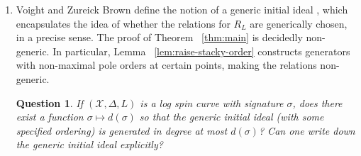 \documentclass{amsart}
\theoremstyle{plain}
\newtheorem{question}[thm]{Question}
\theoremstyle{definition}
\theoremstyle{remark}
\numberwithin{equation}{section}
\newcommand\sx{\mathscr X}
\newcommand{\halfcan}{L}
\begin{document}
\begin{enumerate}
	\item Voight and Zureick Brown define
		the notion of a generic initial ideal \cite[Definition 2.2.7]{vzb:stacky}, which 
		encapsulates the idea of whether the relations for $R_\halfcan$ are 
		generically chosen, in a precise sense. 
		The proof of Theorem
		~\ref{thm:main} is decidedly non-generic. 
		In particular, Lemma ~\ref{lem:raise-stacky-order} 
		constructs generators with non-maximal pole orders at certain 
		points, making the relations non-generic. 
		\begin{question}
		\label{ques:generic-initial}
			If $(\sx, \Delta, \halfcan)$ is a log spin curve with signature $\sigma$,
			does there exist a function $\sigma \mapsto d(\sigma)$ so that
			the generic initial ideal {\rm(}with some specified ordering{\rm)}
			is generated in degree at most $d(\sigma)$? Can one write down the
			generic initial ideal explicitly?
		\end{question}


\end{enumerate}
\end{document}
